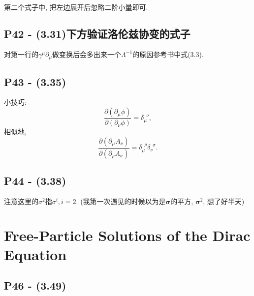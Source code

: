 第二个式子中, 把左边展开后忽略二阶小量即可.

\subsection{P42 - (3.31)下方验证洛伦兹协变的式子}

对第一行的$\gamma^\mu \partial_\mu$做变换后会多出来一个$\Lambda^{-1}$的原因参考书中式(3.3).

\subsection{P43 - (3.35)}

小技巧:
\begin{equation}
  \frac{\partial (\partial_\mu \phi)}{\partial (\partial_\nu \phi)} = \delta_\mu^{\phantom{1}\nu},
\end{equation}
相似地,
\begin{equation}
  \frac{\partial (\partial_\mu A_\nu)}{\partial (\partial_\rho A_\sigma)} = \delta_\mu^{\phantom{1}\rho}\delta_\nu^{\phantom{1}\sigma}.
\end{equation}

\subsection{P44 - (3.38)}

注意这里的$\sigma^2$指$\sigma^i, i=2$.
(我第一次遇见的时候以为是$\bm{\sigma}$的平方, $\bm{\sigma}^2$, 想了好半天)

\section{Free-Particle Solutions of the Dirac Equation}

\subsection{P46 - (3.49)}\label{subsubsec: Boost_u_p}

